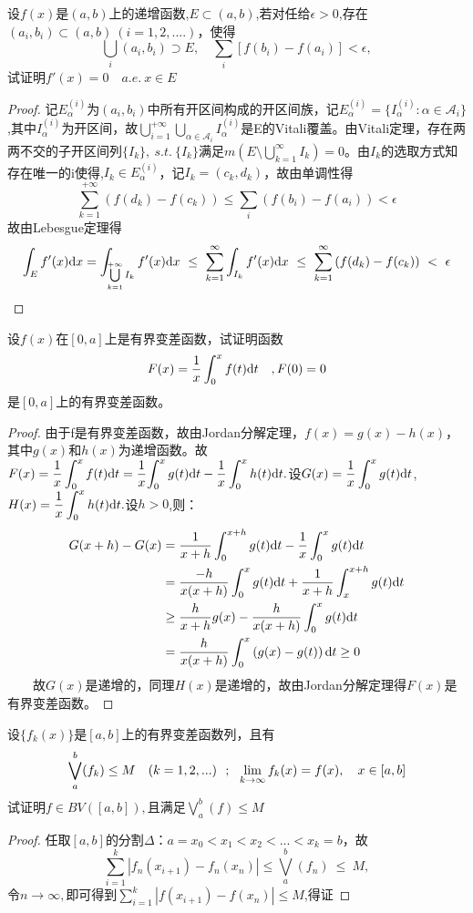 设$f(x)$是$(a,b)$上的递增函数,$E \subset(a,b)$,若对任给$\epsilon>0$,存在$(a_i,b_i)\subset (a,b)\ (i=1,2,....)$，使得$$\bigcup_i (a_i,b_i)\supset E ,\quad \sum\limits_i [f(b_i)-f(a_i)]<\epsilon,$$试证明$f'(x)=0\quad a.e.\ x \in E$
\begin{proof}
	记$E_{\alpha}^{(i)}$为$(a_i,b_i)$中所有开区间构成的开区间族，记$E_{\alpha}^{(i)}=\{I_{\alpha}^{(i)}:\alpha\in \mathscr{A}_i\}$,其中$I_{\alpha}^{(i)}$为开区间，故$\bigcup\limits_{i=1}^{+\infty}\bigcup\limits_{\alpha\in \mathscr{A}_i}I_{\alpha}^{(i)}$是E的Vitali覆盖。由Vitali定理，存在两两不交的子开区间列$\{I_k\}, \ s.t.\ \{I_k\}$满足$m(E\setminus \bigcup\limits_{k=1}^{\infty}I_k)=0$。由$I_k$的选取方式知存在唯一的i使得,$I_k\in E_{\alpha}^{(i)}$，记$I_k=(c_k,d_k)$，故由单调性得$$\sum\limits_{k=1}^{+\infty}\left(f(d_k)-f(c_k) \right)\leq\sum\limits_i\left(f(b_i)-f(a_i) \right)<\epsilon  $$
	故由Lebesgue定理得$$\int_E f'(x)\di{x}=\int_{\bigcup\limits_{k=1}^{+\infty}I_k}f'(x)\di{x}\ \leq\ \sum\limits_{k=1}^{\infty}\int_{I_k}f'(x)\di{x}\ \leq\ \sum\limits_{k=1}^{\infty}\left(f(d_k)-f(c_k) \right) \ <\ \epsilon$$
\end{proof}

设$f(x)$在$[0,a]$上是有界变差函数，试证明函数$$F(x)=\frac{1}{x}\int_{0}^{x}f(t)\mathrm{d}t\quad,F(0)=0$$是$[0,a]$上的有界变差函数。
\begin{proof}
	由于f是有界变差函数，故由Jordan分解定理，$f(x)=g(x)-h(x)$，其中$g(x)$和$h(x)$为递增函数。故$F(x)=\displaystyle{\frac{1}{x}\int_{0}^{x}f(t)\mathrm{d}t}=\frac{1}{x}\displaystyle{\int_{0}^{x}g(t)\mathrm{d}t}-\displaystyle{\frac{1}{x}\int_{0}^{x}h(t)\mathrm{d}t}.$设$G(x)=\displaystyle{\frac{1}{x}\int_{0}^{x}g(t)\mathrm{d}t}$,$H(x)=\displaystyle{\frac{1}{x}\int_{0}^{x}h(t)\mathrm{d}t}.$设$h>0$,则：
	\[\begin{split}
	G(x+h)-G(x)&=\frac{1}{x+h}\int_{0}^{x+h}g(t)\mathrm{d}t-\frac{1}{x}\int_{0}^{x}g(t)\mathrm{d}t\\&=\frac{-h}{x(x+h)}\int_{0}^{x}g(t)\mathrm{d}t+\frac{1}{x+h}\int_{x}^{x+h}g(t)\mathrm{d}t\\&\geq\frac{h}{x+h}g(x)-\frac{h}{x(x+h)}\int_{0}^{x}g(t)\mathrm{d}t\\&=\frac{h}{x(x+h)}\int_{0}^{x}\left( g(x)-g(t)\right) \mathrm{d}t\geq 0
	\end{split}\]
	$\qquad$故$G(x)$是递增的，同理$H(x)$是递增的，故由Jordan分解定理得$F(x)$是有界变差函数。
\end{proof}



设$\{f_k(x)\}$是$[a,b]$上的有界变差函数列，且有$$\bigvee\limits_a^b(f_k)\leq M \quad (k=1,2,...)\ \ ;\ \ \li{k\to\infty}f_k(x)=f(x),\quad x\in[a,b]$$试证明$f\in BV([a,b]),$且满足$\bigvee\limits_a^b(f)\leq M$
\begin{proof}
	任取$[a,b]$的分割$\Delta$：$a=x_0<x_1<x_2<...<x_k=b$，故$$\sum\limits_{i=1}^{k}\left|f_n(x_{i+1})-f_n(x_n) \right|\leq \bigvee\limits_a^b(f_n)\ \leq\  M ,$$
	令$n\to\infty,$即可得到$\sum\limits_{i=1}^{k}\left|f(x_{i+1})-f(x_n) \right|\leq M$,得证
\end{proof}



